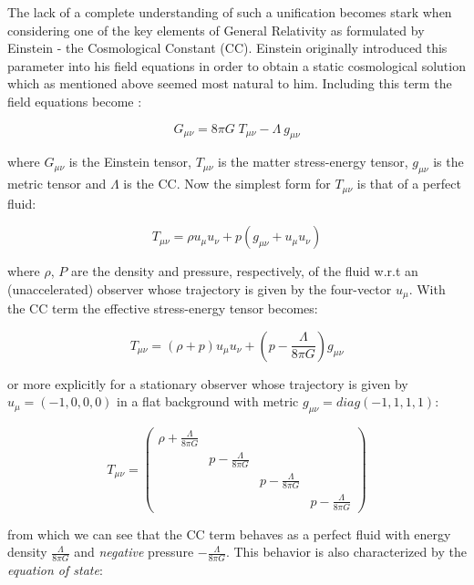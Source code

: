 \begin{doublespace}
The lack of a complete understanding of such a unification becomes
stark when considering one of the key elements of General Relativity
as formulated by Einstein - the Cosmological Constant (CC). Einstein
originally introduced this parameter into his field equations in order
to obtain a static cosmological solution which as mentioned above
seemed most natural to him. Including this term the field equations
become \cite{Wald1984General}:

\begin{equation}
G_{\mu\nu}=8\pi G\; T_{\mu\nu}-\Lambda\: g_{\mu\nu}\label{eq:GRFieldEqn}
\end{equation}


where $G_{\mu\nu}$ is the Einstein tensor, $T_{\mu\nu}$ is the matter
stress-energy tensor, $g_{\mu\nu}$ is the metric tensor and $\Lambda$
is the CC. Now the simplest form for $T_{\mu\nu}$ is that of a perfect
fluid:

\begin{equation}
T_{\mu\nu}=\rho u_{\mu}u_{\nu}+p(g_{\mu\nu}+u_{\mu}u_{\nu})\label{eq:PerfectFluidTensor}\end{equation}


where $\rho$, $P$ are the density and pressure, respectively, of
the fluid w.r.t an (unaccelerated) observer whose trajectory is given
by the four-vector $u_{\mu}$. With the CC term the effective stress-energy
tensor becomes:

\begin{equation}
T_{\mu\nu}=(\rho+p)u_{\mu}u_{\nu}+(p-\frac{\Lambda}{8\pi G})g_{\mu\nu}\end{equation}


or more explicitly for a stationary observer whose trajectory is given
by $u_{\mu}=(-1,0,0,0)$ in a flat background with metric $g_{\mu\nu}=diag(-1,1,1,1)$:

\begin{equation}
T_{\mu\nu}=\left(\begin{array}{cccc}
\rho+\frac{\Lambda}{8\pi G}\\
 & p-\frac{\Lambda}{8\pi G}\\
 &  & p-\frac{\Lambda}{8\pi G}\\
 &  &  & p-\frac{\Lambda}{8\pi G}\end{array}\right)\end{equation}


from which we can see that the CC term behaves as a perfect fluid
with energy density $\frac{\Lambda}{8\pi G}$ and \emph{negative}
pressure $-\frac{\Lambda}{8\pi G}$. This behavior is also characterized
by the \emph{equation of state}:


\end{doublespace}
